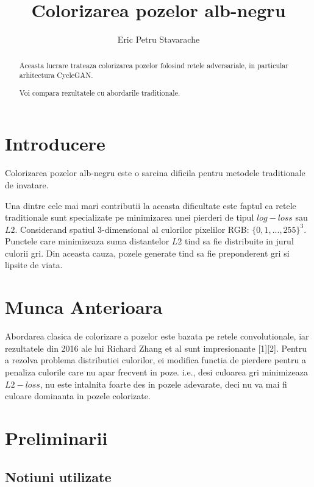 \documentclass[12pt]{article}
\title{Colorizarea pozelor alb-negru}
\date{}
\author{Eric Petru Stavarache}
\theoremstyle{definition}
\begin{document}
\maketitle

\tableofcontents


\begin{abstract}
    Aceasta lucrare trateaza colorizarea pozelor folosind retele adversariale, in particular arhitectura CycleGAN.

    Voi compara rezultatele cu abordarile traditionale.
\end{abstract}

\section{Introducere}

Colorizarea pozelor alb-negru este o sarcina dificila pentru metodele traditionale de invatare.

Una dintre cele mai mari contributii la aceasta dificultate este faptul ca retele traditionale sunt specializate pe minimizarea unei pierderi de tipul $log-loss$ sau $L2$.
Considerand spatiul 3-dimensional al culorilor pixelilor RGB: $\{0, 1, ..., 255 \}^{3}$. Punctele care minimizeaza suma distantelor $L2$ tind sa fie distribuite in jurul culorii gri.
Din aceasta cauza, pozele generate tind sa fie preponderent gri si lipsite de viata.

\section{Munca Anterioara}

Abordarea clasica de colorizare a pozelor este bazata pe retele convolutionale, iar rezultatele din 2016 ale lui Richard Zhang et al sunt impresionante [1][2].
Pentru a rezolva problema distributiei culorilor, ei modifica functia de pierdere pentru a penaliza culorile care nu apar frecvent in poze.
i.e., desi culoarea gri minimizeaza $L2-loss$, nu este intalnita foarte des in pozele adevarate, deci nu va mai fi culoare dominanta in pozele colorizate.


\section{Preliminarii}

\subsection{Notiuni utilizate}
\end{document}
